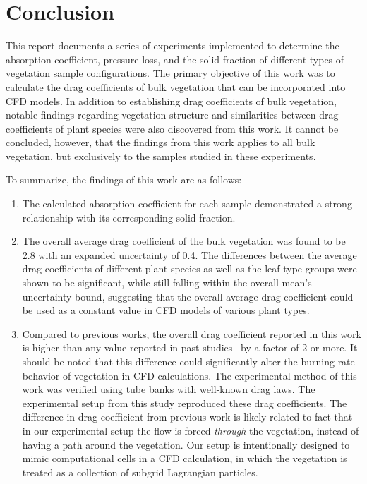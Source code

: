 \documentclass[12pt]{article}
\begin{document}
\clearpage

\section{Conclusion}

This report documents a series of experiments implemented to determine the absorption coefficient, pressure loss, and the solid fraction of different types of vegetation sample configurations. The primary objective of this work was to calculate the drag coefficients of bulk vegetation that can be incorporated into CFD models. In addition to establishing drag coefficients of bulk  vegetation, notable findings regarding vegetation structure and similarities between drag coefficients of plant species were also discovered from this work. It cannot be concluded, however, that the findings from this work applies to all bulk vegetation, but exclusively to the samples studied in these experiments.

To summarize, the findings of this work are as follows:

\begin{enumerate}
  \item The calculated absorption coefficient for each sample demonstrated a strong relationship with its corresponding solid fraction.
  \item The overall average drag coefficient of the bulk vegetation was found to be 2.8 with an expanded uncertainty of 0.4. The differences between the average drag coefficients of different plant species as well as the leaf type groups were shown to be significant, while still falling within the overall mean's uncertainty bound, suggesting that the overall average drag coefficient could be used as a constant value in CFD models of various plant types.
\item Compared to previous works, the overall drag coefficient reported in this work is higher than any value reported in past studies~\cite{Cao2012,Jalonen2014,Mayhead1973,Gillies2002,Ishikawa2006} by a factor of 2 or more.  It should be noted that this difference could significantly alter the burning rate behavior of vegetation in CFD calculations. The experimental method of this work was verified using tube banks with well-known drag laws.  The experimental setup from this study reproduced these drag coefficients.  The difference in drag coefficient from previous work is likely related to fact that in our experimental setup the flow is forced \emph{through} the vegetation, instead of having a path around the vegetation.  Our setup is intentionally designed to mimic computational cells in a CFD calculation, in which the vegetation is treated as a collection of subgrid Lagrangian particles.
\end{enumerate}
\end{document}
